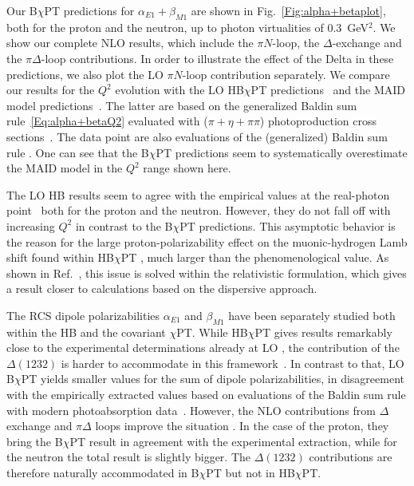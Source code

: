 \documentclass[11pt,preprint,tightenlines,
showpacs,preprintnumbers,amsmath,amssymb,superscriptaddress,a4paper,nofootinbib]{revtex4-1}
\begin{document}
Our B$\chi$PT predictions for $\alpha_{E1}+\beta_{M1}$ are shown in Fig.~\ref{Fig:alpha+betaplot}, both for the proton
and the neutron, up to photon virtualities of $0.3$~GeV$^2$. We show our complete NLO results, which include the $\pi N$-loop, the $\Delta$-exchange and the $\pi \Delta$-loop contributions. In order to illustrate the effect of the Delta in these predictions, we also plot the LO $\pi N$-loop contribution
separately. We compare our results for the $Q^2$
evolution with the LO HB$\chi$PT predictions~\cite{Nevado:2007dd} and the MAID model predictions~\cite{Drechsel:2000ct,Drechsel:1998hk}. The latter are based on the generalized Baldin sum rule~\eqref{Eq:alpha+betaQ2} evaluated with ($\pi+\eta+\pi \pi$) photoproduction
cross sections~\cite{Drechsel:2002ar}. 
The data point are also evaluations of the (generalized) Baldin sum rule \cite{Liang:2004tk,Gryniuk:2015aa,Babusci:1997ij}. One can see that the B$\chi$PT predictions seem to systematically overestimate the MAID model in the $Q^2$ range shown here. 

The LO HB results seem to agree with the empirical values at the real-photon point~\cite{Babusci:1997ij}
both for the proton and the neutron. However, they do not fall off with increasing $Q^2$ in contrast to the B$\chi$PT predictions.
This asymptotic behavior is the reason for the large proton-polarizability effect on the muonic-hydrogen Lamb shift found within HB$\chi$PT \cite{Nevado:2007dd,Peset:2014yha}, much larger than the phenomenological value. As shown in Ref.~\cite{Alarcon:2013cba,Lensky:2017bwi}, this issue is solved within the relativistic formulation, which gives a result closer to calculations based on the dispersive approach.


The RCS dipole polarizabilities $\alpha_{E1}$ and $\beta_{M1}$ have been separately studied both within the HB  and
the covariant $\chi$PT. While  HB$\chi$PT gives results
remarkably close to the experimental determinations already at LO \cite{Bernard:1995dp},
the contribution of the $\Delta(1232)$ is harder to accommodate in this framework~\cite{Hemmert:1996rw}. In contrast to that, LO  B$\chi$PT \cite{Bernard:1991rq,Bernard:1991ru}
yields smaller values for the sum of dipole polarizabilities, in disagreement with the empirically extracted values based on evaluations of the Baldin sum rule with modern photoabsorption data~\cite{Babusci:1997ij,Olm01,Gryniuk:2015aa}. However, the NLO contributions from $\Delta$ exchange and $\pi\Delta$ loops improve the situation \cite{Lensky:2009uv,Lensky:2015awa}.
In the case of the proton, they bring the B$\chi$PT result in agreement with the experimental extraction, while for the neutron the total result is slightly bigger. The $\Delta(1232)$ contributions are therefore naturally accommodated in  B$\chi$PT but not in HB$\chi$PT.
\end{document}

